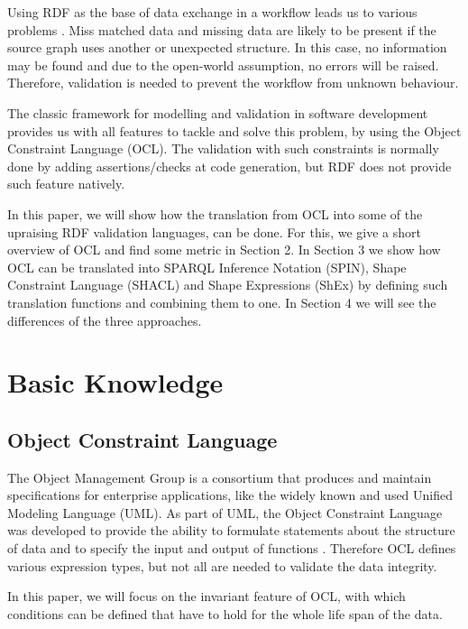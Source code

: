 \documentclass[runningheads]{llncs}
\begin{document}
Using RDF as the base of data exchange in a workflow leads us to various problems \cite{sadiq2004data}.
Miss matched data and missing data are likely to be present if the source graph uses another or unexpected structure.
In this case, no information may be found and due to the open-world assumption, no errors will be raised.
Therefore, validation is needed to prevent the workflow from unknown behaviour.

The classic framework for modelling and validation in software development provides us with all features to tackle and solve this problem, by using the Object Constraint Language (OCL).
The validation with such constraints is normally done by adding assertions/checks at code generation, but RDF does not provide such feature natively.

In this paper, we will show how the translation from OCL into some of the upraising RDF validation languages, can be done.
For this, we give a short overview of OCL and find some metric in Section 2.
In Section 3 we show how OCL can be translated into SPARQL Inference Notation (SPIN), Shape Constraint Language (SHACL) and Shape Expressions (ShEx) by defining such translation functions and combining them to one.
In Section 4 we will see the differences of the three approaches.
\section{Basic Knowledge}
\subsection{Object Constraint Language}
The Object Management Group is a consortium that produces and maintain specifications for enterprise applications, like the widely known and used Unified Modeling Language (UML).
As part of UML, the Object Constraint Language was developed to provide the ability to formulate statements about the structure of data and to specify the input and output of functions \cite{ocl24}.
Therefore OCL defines various expression types, but not all are needed to validate the data integrity.

In this paper, we will focus on the invariant feature of OCL, with which conditions can be defined that have to hold for the whole life span of the data.
\end{document}
